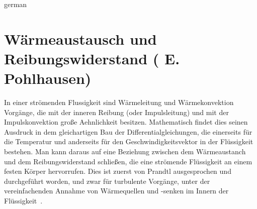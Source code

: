 \documentclass[colorlinks,upint,subscriptcorrection,varvw,balance,loadscripts,german,vietamese]{asmeconf} %
\begin{document}
\begin{selectlanguage}{german}%
\section{Wärmeaustausch und Reibungswiderstand ( E. Pohlhausen)}\label{app:pohlhausen}
In einer strömenden Flussigkeit sind Wärmeleitung und Wärmekonvektion Vorgänge, die mit der inneren Reibung (oder Impulsleitung) und mit der Impulskonvektion große Aehnlichkeit besitzen. Mathematisch findet dies seinen Ausdruck in dem gleichartigen Bau der Differentialgleichungen, die einerseits für die Temperatur und anderseits für den Geschwindigkeitsvektor in der Flüssigkeit bestehen. Man kann daraus auf eine Beziehung
zwischen dem Wärmeaustanch und dem Reibungswiderstand schließen, die eine strömende Flüssigkeit an einem festen Körper hervorrufen. Dies ist zuerst von Prandtl ausgesprochen und durchgeführt worden, und zwar für turbulente Vorgänge, unter der vereinfachenden Annahme von Wärmequellen und -senken im Innern der Flüssigkeit~\cite{pohlhausen1921}. 
\end{selectlanguage}%


%
 
\end{document}
